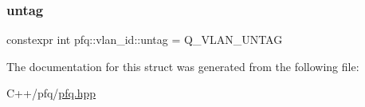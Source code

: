 \subsubsection{\texorpdfstring{untag}{untag}}
{\footnotesize\ttfamily constexpr int pfq\+::vlan\+\_\+id\+::untag = Q\+\_\+\+V\+L\+A\+N\+\_\+\+U\+N\+T\+AG\hspace{0.3cm}{\ttfamily [static]}}



The documentation for this struct was generated from the following file\+:\begin{DoxyCompactItemize}
\item 
C++/pfq/\hyperlink{pfq_8hpp}{pfq.\+hpp}\end{DoxyCompactItemize}
